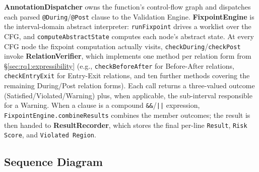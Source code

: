 \documentclass[pdflatex,sn-basic]{sn-jnl}%
\theoremstyle{thmstyleone}%
\theoremstyle{thmstyletwo}%
\theoremstyle{thmstylethree}%
\begin{document}
\textbf{AnnotationDispatcher} owns the function's control-flow graph and dispatches each parsed \texttt{@During}/\texttt{@Post} clause to the Validation Engine. \textbf{FixpointEngine} is the interval-domain abstract interpreter: \texttt{runFixpoint} drives a worklist over the CFG, and \texttt{computeAbstractState} computes each node's abstract state. At every CFG node the fixpoint computation actually visits, \texttt{checkDuring}/\texttt{checkPost} invoke \textbf{RelationVerifier}, which implements one method per relation form from \S\ref{sec:rq1:expressibility} (e.g., \texttt{checkBeforeAfter} for Before-After relations, \texttt{checkEntryExit} for Entry-Exit relations, and ten further methods covering the remaining During/Post relation forms). Each call returns a three-valued outcome (Satisfied/Violated/Warning) plus, when applicable, the sub-interval responsible for a Warning. When a clause is a compound \texttt{\&\&}/\texttt{||} expression, \texttt{FixpointEngine.combineResults} combines the member outcomes; the result is then handed to \textbf{ResultRecorder}, which stores the final per-line \texttt{Result}, \texttt{Risk Score}, and \texttt{Violated Region}.

\subsection{Sequence Diagram}
\label{appendix:validation-engine-sequence}
\end{document}
